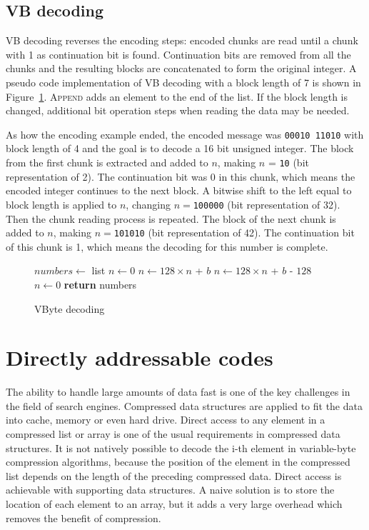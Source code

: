 \section{VB decoding}
VB decoding reverses the encoding steps: encoded chunks are read until a chunk with 1 as continuation bit is found. Continuation bits 
are removed from all the chunks and the resulting blocks are concatenated to form the original integer. A pseudo code implementation of VB decoding with a block length of 7 is shown in Figure~\ref{vbyte_dec}.
\textsc{Append} adds an element to the end of the list. If the block length is changed, additional bit operation steps when reading the data may be needed.

As how the encoding example ended, the encoded message was \texttt{00010 11010} with block length of 4 and the goal is to decode a 16 bit unsigned integer. The block from the first chunk is 
extracted and added to $n$, making $n$ = \texttt{10} (bit representation of 2).
The continuation bit was 0 in this chunk, which means the encoded integer continues to the next block. A bitwise shift to the left equal to block length is applied to $n$, 
changing $n = $\texttt{100000} (bit representation of 32). Then the chunk reading process is repeated. The block of the next chunk is added to $n$, making 
$n = $\texttt{101010} (bit representation of 42). The continuation bit of this chunk is 1, which means the decoding for this number is complete. 

\begin{figure}[ht]
\centering
  \begin{minipage}{0.5\linewidth}
\begin{algorithmic}[H]
\State $numbers\gets $ list
\State $n\gets 0$
\State $n\gets 128\times n $ + $b$
\Else
\State $n\gets 128\times n $ + $b$ - $128$
\State {}
\State $n\gets 0$
\EndIf
\EndFor
\State \textbf{return} numbers
\EndFunction
\end{algorithmic}
\end{minipage}
\caption{VByte decoding} \label{vbyte_dec}
\end{figure}



\chapter{Directly addressable codes} \label{chapter:DAC}

The ability to handle large amounts of data fast is one of the key challenges in the field of search engines. Compressed data structures are applied to fit the 
data into cache, memory or even hard drive. Direct access to any element in a compressed list or array is one of the usual requirements in compressed data 
structures. It is not natively possible to decode the i-th element in variable-byte compression algorithms, because the position of the element in the compressed
list depends on the length of the preceding compressed data. Direct access is achievable with supporting data structures. A naive solution is to store the location 
of each element to an array, but it adds a very large overhead which removes the benefit of compression.

